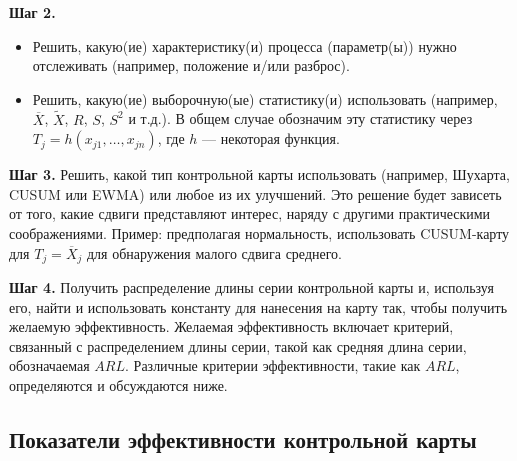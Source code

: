\textbf{Шаг 2.}
\begin{itemize}
	\item Решить, какую(ие) характеристику(и) процесса (параметр(ы)) нужно отслеживать (например, положение и/или разброс).
	\item Решить, какую(ие) выборочную(ые) статистику(и) использовать (например, \(\overline{X}\), \(\tilde{X}\), \(R\), \(S\), \(S^2\) и т.д.). В общем случае обозначим эту статистику через \(T_j = h(x_{j1}, \ldots, x_{jn})\), где \(h\) — некоторая функция.
\end{itemize}

\textbf{Шаг 3.} Решить, какой тип контрольной карты использовать (например, Шухарта, CUSUM или EWMA) или любое из их улучшений. Это решение будет зависеть от того, какие сдвиги представляют интерес, наряду с другими практическими соображениями. Пример: предполагая нормальность, использовать CUSUM-карту для \(T_j = \overline{X}_j\) для обнаружения малого сдвига среднего.

\textbf{Шаг 4.} Получить распределение длины серии контрольной карты и, используя его, найти и использовать константу для нанесения на карту так, чтобы получить желаемую эффективность. Желаемая эффективность включает критерий, связанный с распределением длины серии, такой как средняя длина серии, обозначаемая \(ARL\). Различные критерии эффективности, такие как \(ARL\), определяются и обсуждаются ниже.

\subsection{Показатели эффективности контрольной карты}

